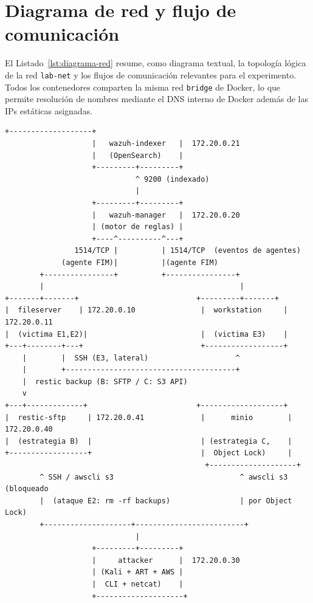 \documentclass[../main.tex]{subfiles}
\begin{document}
\section{Diagrama de red y flujo de comunicación}
\label{sec:diagrama-red}

El Listado~\ref{lst:diagrama-red} resume, como diagrama textual, la topología
lógica de la red \texttt{lab-net} y los flujos de comunicación relevantes para el experimento.
Todos los contenedores comparten la misma red \texttt{bridge} de Docker, lo que
permite resolución de nombres mediante el DNS interno de Docker además de
las IPs estáticas asignadas.

\begin{lstlisting}[style=bash, caption={Topología lógica de la red \texttt{lab-net}
  y flujos de comunicación principales entre contenedores.},
  label={lst:diagrama-red}]
                    +-------------------+
                    |   wazuh-indexer   |  172.20.0.21
                    |   (OpenSearch)    |
                    +---------+---------+
                              ^ 9200 (indexado)
                              |
                    +---------+---------+
                    |   wazuh-manager   |  172.20.0.20
                    | (motor de reglas) |
                    +----^----------^---+
                1514/TCP |          | 1514/TCP  (eventos de agentes)
             (agente FIM)|          |(agente FIM)
        +----------------+          +----------------+
        |                                             |
+-------+-------+                           +---------+-------+
|  fileserver    | 172.20.0.10               |  workstation     | 172.20.0.11
|  (victima E1,E2)|                          |  (victima E3)    |
+---+--------+---+                           +------------------+
    |        |  SSH (E3, lateral)                    ^
    |        +---------------------------------------+
    |  restic backup (B: SFTP / C: S3 API)
    v
+---+-------------+                         +-------------------+
|  restic-sftp     | 172.20.0.41             |      minio        | 172.20.0.40
|  (estrategia B)  |                         | (estrategia C,    |
+------------------+                         |  Object Lock)     |
                                              +--------------------+
        ^ SSH / awscli s3                             ^ awscli s3 (bloqueado
        |  (ataque E2: rm -rf backups)                | por Object Lock)
        +--------------------+-------------------------+
                              |
                    +---------+---------+
                    |     attacker      |  172.20.0.30
                    | (Kali + ART + AWS |
                    |  CLI + netcat)    |
                    +--------------------+
\end{lstlisting}
\end{document}
